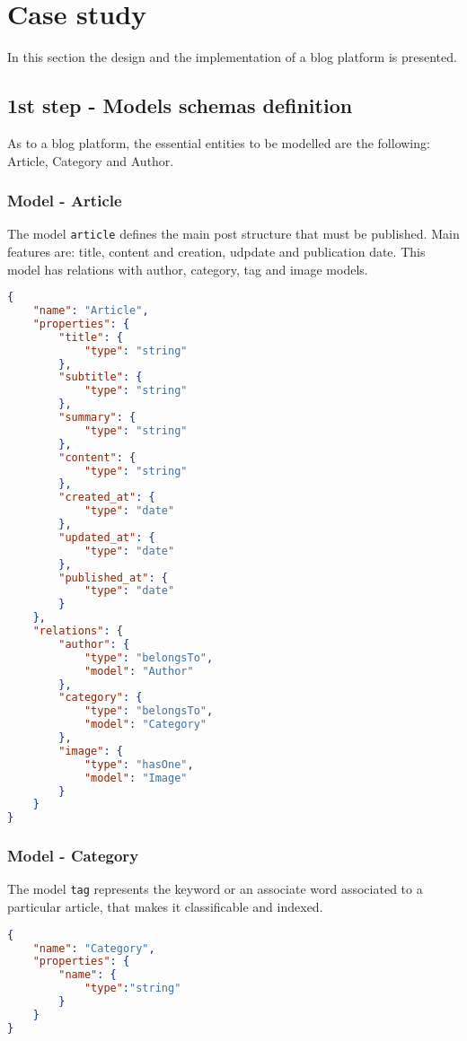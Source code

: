 \section{Case study}
\label{sec:CAS_castudy}

In this section the design and the implementation of a blog platform is presented.

\subsection{1st step - Models schemas definition}

As to a blog platform, the essential entities to be modelled are the following: Article, Category and Author.

\subsubsection{Model - Article}

The model \texttt{article} defines the main post structure that must be published. Main features are: title, content and creation, udpdate and publication date. This model has relations with author, category, tag and image models. 

\begin{lstlisting}[language=json]
{
	"name": "Article",
	"properties": {
		"title": {
      		"type": "string"
    	},
    	"subtitle": {
      		"type": "string"
    	},
    	"summary": {
      		"type": "string"
    	},
    	"content": {
      		"type": "string"
    	},
    	"created_at": {
      		"type": "date"
    	},
    	"updated_at": {
      		"type": "date"
    	},
    	"published_at": {
      		"type": "date"
    	}
  	},
	"relations": {
    	"author": {
      		"type": "belongsTo",
      		"model": "Author"
    	},
    	"category": {
      		"type": "belongsTo",
      		"model": "Category"
    	},
    	"image": {
      		"type": "hasOne",
      		"model": "Image"
    	}
    }
}
\end{lstlisting}
\subsubsection{Model - Category}

The model \texttt{tag} represents the keyword or an associate word associated to a particular article, that makes it classificable and indexed.

\begin{lstlisting}[language=json]
{
	"name": "Category",
	"properties": {
		"name": {
			"type":"string"
		}
	}
}
\end{lstlisting}
